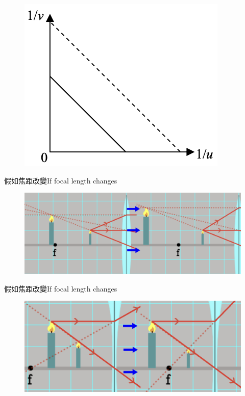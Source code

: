 \documentclass[beamer=true]{standalone}
\begin{document}
\begin{eg}
\begin{tasks}[item-indent=2em,label-offset=0em,before-skip=.3em,after-item-skip=.5em]
\begin{figure}
        \end{figure}
        \task
        \begin{figure}
            \centering
            \includegraphics[width=0.7\linewidth]{../../assets/deqdededqewdeqe.png}
        \end{figure}
    \end{tasks}
\end{eg}



\begin{frame}{假如焦距改變If focal length changes}
    \begin{figure}
        \centering
        \includegraphics[width=1\linewidth]{../../assets/x9n80ue213e.png}
    \end{figure}
\end{frame}

\begin{frame}{假如焦距改變If focal length changes}
    \begin{figure}
        \centering
        \includegraphics[width=1\linewidth]{../../assets/n9du82u8e.png}
    \end{figure}
\end{frame}
\end{document}
